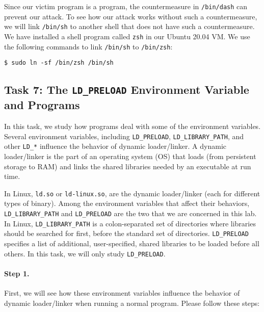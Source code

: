 Since our victim program is a \setuid program, 
the countermeasure in \texttt{/bin/dash} can prevent our attack. 
To see how our attack works without such a countermeasure, 
we will link \texttt{/bin/sh} to another shell that does not
have such a countermeasure.  We have installed a shell program
called \texttt{zsh} in our Ubuntu 20.04 VM. We use the following
commands to link \texttt{/bin/sh} to \texttt{/bin/zsh}:

\begin{lstlisting}
$ sudo ln -sf /bin/zsh /bin/sh
\end{lstlisting}




\subsection{Task 7: The {\tt LD\_PRELOAD} Environment 
Variable and \setuid Programs}


In this task, we study how \setuid programs deal
with some of the environment variables.
Several environment variables, including {\tt LD\_PRELOAD}, 
{\tt LD\_LIBRARY\_PATH}, and other {\tt LD\_*} influence the 
behavior of dynamic loader/linker.
A dynamic loader/linker is the part of an operating system (OS) that 
loads (from persistent storage to RAM) and links the shared libraries 
needed by an executable at run time. 

In Linux, {\tt ld.so} or {\tt ld-linux.so}, are the dynamic 
loader/linker (each for different types of binary).
Among the environment variables that affect their behaviors,
{\tt LD\_LIBRARY\_PATH} and {\tt LD\_PRELOAD} are the two
that we are concerned in this lab. 
In Linux, {\tt LD\_LIBRARY\_PATH} is a colon-separated set
of directories where libraries should be searched for first, before the
standard set of directories. 
{\tt LD\_PRELOAD} specifies a list of additional, user-specified, shared libraries to
be loaded before all others. In this task, we will only 
study {\tt LD\_PRELOAD}.


\paragraph{Step 1.} 
First, we will see how these environment variables influence the 
behavior of dynamic loader/linker when running a normal program. 
Please follow these steps:


